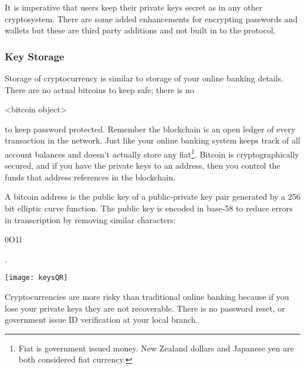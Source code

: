 It is imperative that users keep their private keys secret as in any other cryptosystem. There are some added enhancements for encrypting passwords and wallets but these are third party additions and not built in to the protocol.

\subsubsection*{Key Storage}

Storage of cryptocurrency is similar to storage of your online banking details. There are no actual bitcoins to keep safe; there is no \begin{code}<bitcoin object>\end{code} to keep password protected. Remember the blockchain is an open ledger of every transaction in the network. Just like your online banking system keeps track of all account balances and doesn't actually store any fiat\footnote{Fiat is government issued money. New Zealand dollars and Japanese yen are both considered fiat currency.}. Bitcoin is cryptographically secured, and if you have the private keys to an address, then you control the funds that address references in the blockchain. 

A bitcoin address is the public key of a public-private key pair generated by a 256 bit elliptic curve function. The public key is encoded in base-58 to reduce errors in transcription by removing similar characters: \begin{code}0O1l\end{code}.
\begin{center}
	\texttt{[image: keysQR]}\end{center}
Cryptocurrencies are more risky than traditional online banking because if you lose your private keys they are not recoverable. There is no password reset, or government issue ID verification at your local branch. 

